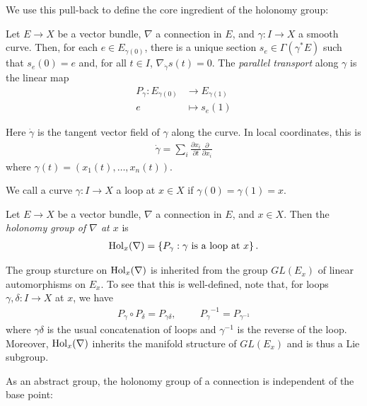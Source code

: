 \documentclass{article}
\begin{document}
We use this pull-back to define the core ingredient of the holonomy group:

\begin{definition}
  Let $E\to X$ be a vector bundle, $\nabla$ a connection in $E$,
  and $\gamma:I\to X$ a smooth curve. Then,
  for each $e\in E_{\gamma(0)}$, there is a unique section $s_e\in\Gamma(\gamma^* E)$
  such that $s_e(0)=e$ and, for all $t\in I$, $\nabla_{\dot\gamma} s(t) = 0$.
  The \emph{parallel transport} along $\gamma$ is the linear map
  \begin{align*}
    P_\gamma : E_{\gamma(0)} &\to E_{\gamma(1)} \\
    e &\mapsto s_e(1)
  \end{align*}
\end{definition}

Here $\dot\gamma$ is the tangent vector field of $\gamma$ along the curve.
In local coordinates, this is
\begin{align*}
  \dot\gamma = \sum_i \frac{\partial x_i}{\partial t} \frac{\partial}{\partial x_i}
\end{align*}
where $\gamma(t) = (x_1(t),\ldots,x_n(t))$.

We call a curve $\gamma : I\to X$ a loop at $x\in X$ if $\gamma(0)=\gamma(1)=x$.

\begin{definition}
  Let $E\to X$ be a vector bundle, $\nabla$ a connection in $E$,
  and $x\in X$. Then the \emph{holonomy group of $\nabla$ at $x$}
  is
  \begin{align*}
    \operatorname{Hol}_x(\nabla) = \left\lbrace{P_\gamma : \text{$\gamma$ is a loop at $x$}}\right\rbrace.
  \end{align*}
\end{definition}

The group sturcture on $\operatorname{Hol}_x(\nabla)$ is inherited from the group $GL(E_x)$ of linear automorphisms on $E_x$. To see that this is well-defined, note
that, for loops $\gamma,\delta : I \to X$ at $x$, we have
\begin{align*}
  P_\gamma\circ P_\delta = P_{\gamma\delta}, \hspace{1cm}
  {P_\gamma}^{-1} = P_{{\gamma}^{-1}}
\end{align*}
where $\gamma\delta$ is the usual concatenation of loops and ${\gamma}^{-1}$
is the reverse of the loop. Moreover, $\operatorname{Hol}_x(\nabla)$ inherits the
manifold structure of $GL(E_x)$ and is thus a Lie subgroup.

As an abstract group, the holonomy group of a connection is independent
of the base point:
\end{document}
